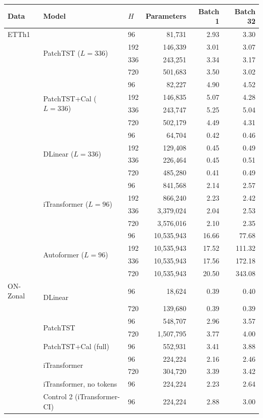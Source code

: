 \begin{tabular}{@{}lllrrr@{}}
\toprule
Data & Model & $H$ & Parameters & Batch 1 & Batch 32 \\
\midrule
ETTh1 & \multirow{4}{*}{PatchTST ($L{=}336$)} & 96 & 81{,}731 & 2.93 & 3.30 \\
 &  & 192 & 146{,}339 & 3.01 & 3.07 \\
 &  & 336 & 243{,}251 & 3.34 & 3.17 \\
 &  & 720 & 501{,}683 & 3.50 & 3.02 \\
 & \multirow{4}{*}{PatchTST+Cal ($L{=}336$)} & 96 & 82{,}227 & 4.90 & 4.52 \\
 &  & 192 & 146{,}835 & 5.07 & 4.28 \\
 &  & 336 & 243{,}747 & 5.25 & 5.04 \\
 &  & 720 & 502{,}179 & 4.49 & 4.31 \\
 & \multirow{4}{*}{DLinear ($L{=}336$)} & 96 & 64{,}704 & 0.42 & 0.46 \\
 &  & 192 & 129{,}408 & 0.45 & 0.49 \\
 &  & 336 & 226{,}464 & 0.45 & 0.51 \\
 &  & 720 & 485{,}280 & 0.41 & 0.49 \\
 & \multirow{4}{*}{iTransformer ($L{=}96$)} & 96 & 841{,}568 & 2.14 & 2.57 \\
 &  & 192 & 866{,}240 & 2.23 & 2.42 \\
 &  & 336 & 3{,}379{,}024 & 2.04 & 2.53 \\
 &  & 720 & 3{,}576{,}016 & 2.10 & 2.35 \\
 & \multirow{4}{*}{Autoformer ($L{=}96$)} & 96 & 10{,}535{,}943 & 16.66 & 77.68 \\
 &  & 192 & 10{,}535{,}943 & 17.52 & 111.32 \\
 &  & 336 & 10{,}535{,}943 & 17.56 & 172.18 \\
 &  & 720 & 10{,}535{,}943 & 20.50 & 343.08 \\
\midrule
ON-Zonal & \multirow{2}{*}{DLinear} & 96 & 18{,}624 & 0.39 & 0.40 \\
 &  & 720 & 139{,}680 & 0.39 & 0.39 \\
 & \multirow{2}{*}{PatchTST} & 96 & 548{,}707 & 2.96 & 3.57 \\
 &  & 720 & 1{,}507{,}795 & 3.77 & 4.00 \\
 & \multirow{1}{*}{PatchTST+Cal (full)} & 96 & 552{,}931 & 3.41 & 3.88 \\
 & \multirow{2}{*}{iTransformer} & 96 & 224{,}224 & 2.16 & 2.46 \\
 &  & 720 & 304{,}720 & 3.39 & 3.42 \\
 & \multirow{1}{*}{iTransformer, no tokens} & 96 & 224{,}224 & 2.23 & 2.64 \\
 & \multirow{1}{*}{Control 2 (iTransformer-CI)} & 96 & 224{,}224 & 2.88 & 3.00 \\
\bottomrule
\end{tabular}
